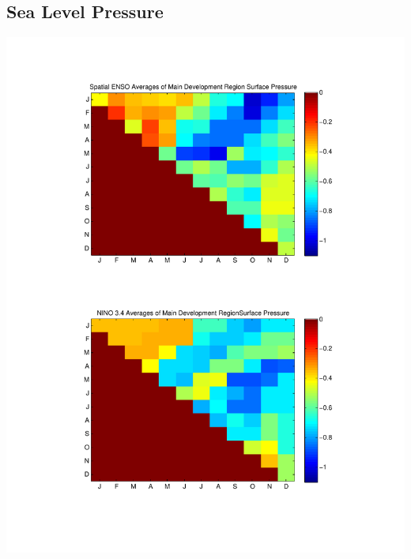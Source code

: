 \documentclass[11pt]{article}
\begin{document}
\subsection{Sea Level Pressure}
\includegraphics[scale=0.7]{images/varyingMonthsForMDRAveragesSurfacePressure.pdf}
\end{document}
